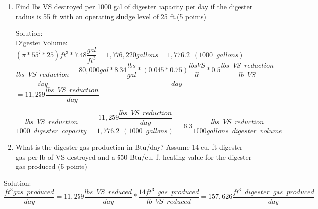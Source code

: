 \documentclass{article}
\begin{document}
\begin{enumerate}
\begin{enumerate}
\item Find lbs VS destroyed per 1000 gal of digester capacity per day if the digester radius is 55 ft with an operating sludge level of 25 ft.(5 points)

\vspace{1cm}
Solution:\\
Digester Volume: 
$
{
		(\pi*55^2*25)ft^3 *7.48 \dfrac{gal}{ft^3}
	}=1,776,220 gallons=1,776.2 \enspace(1000 \enspace gallons)
$
\\
\vspace{3mm}
$
	\dfrac
	{
	lbs \enspace VS \enspace reduction
	}
	{
	day
	}
	=
	\dfrac
	{
	80,000 gal * 8.34 \dfrac{lbs}{gal}*(0.045*0.75) \dfrac{lbs VS}{lb}*0.5\dfrac{lbs \enspace VS \enspace  reduction}{lb \enspace VS}
	}
	{
	day
	}$\\
\vspace{0.5cm}
$
 	=11,259
	\dfrac
	{
	lbs \enspace VS \enspace reduction
	}
	{
	day 
	}
$
\\
\vspace{3mm}


$
	\dfrac
	{
	lbs \enspace VS \enspace reduction
	}
	{
	1000 \enspace digester \enspace capacity
	}
	=
	\dfrac
	{
	11,259 \dfrac
			{
			lbs \enspace VS \enspace reduction
			}
			{
			day
			}
	}
	{	
	1,776.2 \enspace (1000 \enspace gallons)
	}
 	=\boxed{6.3
	\dfrac
	{
	lbs \enspace VS \enspace reduction
	}
	{
	1000 gallons \enspace digester \enspace volume 
	}}
$
\\

\vspace{1cm}

\item  What is the digester gas production in Btu/day? Assume 14 cu. ft digester gas per lb of VS destroyed and a 650 Btu/cu. ft heating value for the digester gas produced (5 points)
\end{enumerate}
\vspace{1cm}
Solution:\\

$
	\dfrac 
	{
	ft^3 gas \enspace produced
	}
	{
	day
	}
	=
	11,259 \dfrac
			{
			lbs \enspace VS \enspace reduced
			}
			{
			day
			}
			*
		\dfrac
		{
		14 ft^3 \enspace gas \enspace produced
		}
		{
		lb \enspace VS \enspace reduced
		}
		=157,626 \dfrac
				{
				ft^3 \enspace digester \enspace 					gas \enspace produced
				}
				{
				day
				}
$
\\
\vspace{1cm}



\end{enumerate}
\end{document}
